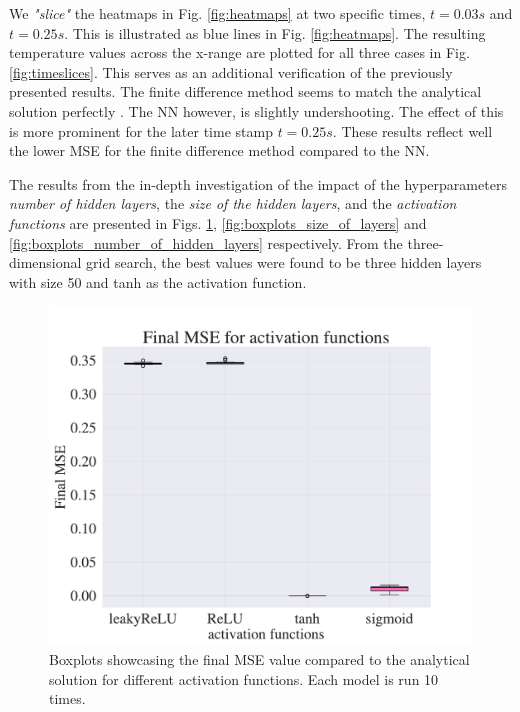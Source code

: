 We \textit{"slice"} the heatmaps in Fig. \ref{fig:heatmaps} at two specific times, $t = 0.03 s$ and $t = 0.25 s$. 
This is illustrated as blue lines in Fig. \ref{fig:heatmaps}.
The resulting temperature values across the x-range are plotted for all three cases in Fig. \ref{fig:timeslices}.
This serves as an additional verification of the previously presented results. 
The finite difference method seems to match the analytical solution perfectly .
The NN however, is slightly undershooting. 
The effect of this is more prominent for the later time stamp $t = 0.25 s$. 
These results reflect well the lower MSE for the finite difference method compared to the NN. 





The results from the in-depth investigation of the impact of the hyperparameters \textit{number of hidden layers}, the \textit{size of the hidden layers}, and the \textit{activation functions} are presented in Figs. \ref{fig:boxplots_activations}, \ref{fig:boxplots_size_of_layers} and \ref{fig:boxplots_number_of_hidden_layers} respectively. 
From the three-dimensional grid search, the best values were found to be three hidden layers with size 50 and tanh as the activation function.


\begin{figure}[h!]
    \centering
    \includegraphics[width=1.0\linewidth]{project_3/plots/activation_search.pdf}
    \caption{Boxplots showcasing the final MSE value compared to the analytical solution for different activation functions. Each model is run 10 times.}
    \label{fig:boxplots_activations}
\end{figure}

